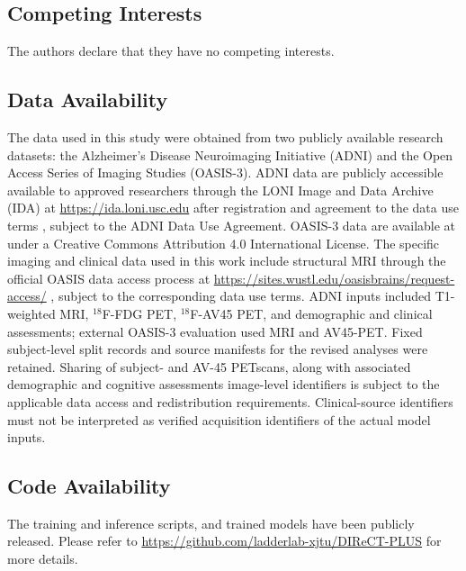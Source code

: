 \documentclass{article}
\providecommand{\DIFaddtex}[1]{{\protect\color{blue} \sf #1}} %
\providecommand{\DIFdeltex}[1]{{\protect\color{red} \scriptsize #1}} %
\providecommand{\DIFaddbegin}{} %
\providecommand{\DIFaddend}{} %
\providecommand{\DIFdelbegin}{} %
\providecommand{\DIFdelend}{} %
\providecommand{\DIFadd}[1]{\texorpdfstring{\DIFaddtex{#1}}{#1}} %
\providecommand{\DIFdel}[1]{\texorpdfstring{\DIFdeltex{#1}}{}} %
\newcommand{\DIFscaledelfig}{0.5}
\newlength{\DIFdelgraphicswidth} %
\newlength{\DIFdelgraphicsheight} %
\newcommand{\DIFaddincludegraphics}[2][]{{\color{blue}\fbox{\DIFOincludegraphics[#1]{#2}}}} %
\newcommand{\DIFdelincludegraphics}[2][]{%
\sbox{\DIFdelgraphicsbox}{\DIFOincludegraphics[#1]{#2}}%
\settoboxwidth{\DIFdelgraphicswidth}{\DIFdelgraphicsbox} %
\settoboxtotalheight{\DIFdelgraphicsheight}{\DIFdelgraphicsbox} %
\scalebox{\DIFscaledelfig}{%
\parbox[b]{\DIFdelgraphicswidth}{\usebox{\DIFdelgraphicsbox}\\[-\baselineskip] \rule{\DIFdelgraphicswidth}{0em}}\llap{\resizebox{\DIFdelgraphicswidth}{\DIFdelgraphicsheight}{%
\setlength{\unitlength}{\DIFdelgraphicswidth}%
\begin{picture}(1,1)%
\thicklines\linethickness{2pt} %
{\color[rgb]{1,0,0}\put(0,0){\framebox(1,1){}}}%
{\color[rgb]{1,0,0}\put(0,0){\line( 1,1){1}}}%
{\color[rgb]{1,0,0}\put(0,1){\line(1,-1){1}}}%
\end{picture}%
}\hspace*{3pt}}} %
} %
\DeclareRobustCommand{\DIFaddbegin}{\DIFOaddbegin \let\includegraphics\DIFaddincludegraphics} %
\DeclareRobustCommand{\DIFaddend}{\DIFOaddend \let\includegraphics\DIFOincludegraphics} %
\DeclareRobustCommand{\DIFdelbegin}{\DIFOdelbegin \let\includegraphics\DIFdelincludegraphics} %
\DeclareRobustCommand{\DIFdelend}{\DIFOaddend \let\includegraphics\DIFOincludegraphics} %
\begin{document}
\subsection*{Competing Interests}
The authors declare that they have no competing interests.

\subsection*{Data Availability}
The data used in this study were obtained from two \DIFdelbegin \DIFdel{publicly available }\DIFdelend \DIFaddbegin \DIFadd{research }\DIFaddend datasets: the Alzheimer's Disease Neuroimaging Initiative (ADNI) and the Open Access Series of Imaging Studies (OASIS-3). ADNI data are \DIFdelbegin \DIFdel{publicly accessible }\DIFdelend \DIFaddbegin \DIFadd{available to approved researchers }\DIFaddend through the LONI Image and Data Archive (IDA) at \url{https://ida.loni.usc.edu}\DIFdelbegin \DIFdel{after registration and agreement to the data use terms}\DIFdelend \DIFaddbegin \DIFadd{, subject to the ADNI Data Use Agreement}\DIFaddend . OASIS-3 data are available \DIFdelbegin \DIFdel{at }%
\DIFdel{under a Creative Commons Attribution 4.0 International License. The specific imaging and clinical data used in this work include structural MRI}\DIFdelend \DIFaddbegin \DIFadd{through the official OASIS data access process at }\url{https://sites.wustl.edu/oasisbrains/request-access/}\DIFadd{, subject to the corresponding data use terms. ADNI inputs included T1-weighted MRI, $^{18}$F-FDG PET, $^{18}$F-AV45 PET, and demographic and clinical assessments; external OASIS-3 evaluation used MRI and AV45-PET. Fixed subject-level split records and source manifests for the revised analyses were retained. Sharing of subject- }\DIFaddend and \DIFdelbegin \DIFdel{AV-45 PETscans, along with associated demographic and cognitive assessments}\DIFdelend \DIFaddbegin \DIFadd{image-level identifiers is subject to the applicable data access and redistribution requirements. Clinical-source identifiers must not be interpreted as verified acquisition identifiers of the actual model inputs}\DIFaddend .

\subsection*{Code Availability}
The training and inference scripts, and trained models have been publicly released. Please refer to \url{https://github.com/ladderlab-xjtu/DIReCT-PLUS} for more details.
\end{document}
